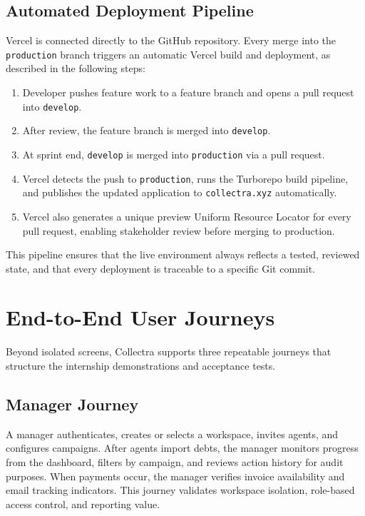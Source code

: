﻿\documentclass[12pt,a4paper]{report}
\begin{document}
\subsection{Automated Deployment Pipeline}

Vercel is connected directly to the GitHub repository.
Every merge into the \texttt{production} branch triggers an automatic Vercel build
and deployment, as described in the following steps:

\begin{enumerate}
  \item Developer pushes feature work to a feature branch and opens a pull request into \texttt{develop}.
  \item After review, the feature branch is merged into \texttt{develop}.
  \item At sprint end, \texttt{develop} is merged into \texttt{production} via a pull request.
  \item Vercel detects the push to \texttt{production}, runs the Turborepo build pipeline,
        and publishes the updated application to \texttt{collectra.xyz} automatically.
  \item Vercel also generates a unique preview Uniform Resource Locator for every pull request, enabling
        stakeholder review before merging to production.
\end{enumerate}

This pipeline ensures that the live environment always reflects a tested, reviewed
state, and that every deployment is traceable to a specific Git commit.

\section{End-to-End User Journeys}
\label{sec:user-journeys}

Beyond isolated screens, Collectra supports three repeatable journeys that structure the
internship demonstrations and acceptance tests.

\subsection{Manager Journey}

A manager authenticates, creates or selects a workspace, invites agents, and configures campaigns.
After agents import debts, the manager monitors progress from the dashboard, filters by campaign,
and reviews action history for audit purposes.
When payments occur, the manager verifies invoice availability and email tracking indicators.
This journey validates workspace isolation, role-based access control, and reporting value.
\end{document}
